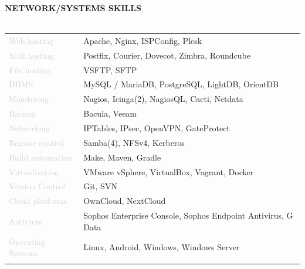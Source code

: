 \documentclass{article}
\begin{document}
\textbf{\textcolor{deepblue}{NETWORK/SYSTEMS SKILLS}} \\\\ \hfill
\begin{tabular}{ R{4cm} l }
	\textcolor{lightgray}{Web hosting}       & Apache, Nginx, ISPConfig, Plesk                              \\ \hfill
	\textcolor{lightgray}{Mail hosting}      & Postfix, Courier, Dovecot, Zimbra, Roundcube                 \\ \hfill
	\textcolor{lightgray}{File hosting}      & VSFTP, SFTP                                                  \\ \hfill
	\textcolor{lightgray}{DBMS}              & MySQL / MariaDB, PostgreSQL, LightDB, OrientDB               \\ \hfill
	\textcolor{lightgray}{Monitoring}        & Nagios, Icinga(2), NagiosQL, Cacti, Netdata                  \\ \hfill
	\textcolor{lightgray}{Backup}            & Bacula, Veeam                                                \\ \hfill
	\textcolor{lightgray}{Networking}        & IPTables, IPsec, OpenVPN, GateProtect                        \\ \hfill
	\textcolor{lightgray}{Remote control}    & Samba(4), NFSv4, Kerberos                                    \\ \hfill
	\textcolor{lightgray}{Build automation}  & Make, Maven, Gradle                                          \\ \hfill
	\textcolor{lightgray}{Virtualization}    & VMware vSphere, VirtualBox, Vagrant, Docker                  \\ \hfill
	\textcolor{lightgray}{Version Control}   & Git, SVN                                                     \\ \hfill
	\textcolor{lightgray}{Cloud platforms}   & OwnCloud, NextCloud                                          \\ \hfill
	\textcolor{lightgray}{Antivirus}         & Sophos Enterprise Console, Sophos Endpoint Antivirus, G Data \\ \hfill
	\textcolor{lightgray}{Operating Systems} & Linux, Android, Windows, Windows Server                      \\ \hfill
\end{tabular}
\end{document}
